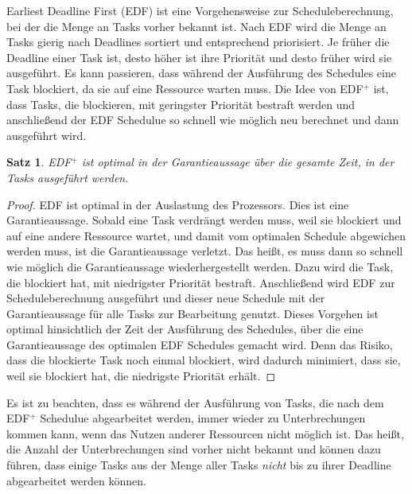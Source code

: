 \documentclass{scrarticle}
\newtheorem{satz}{Satz}[section]
\numberwithin{equation}{section}
\begin{document}
Earliest Deadline First (EDF) ist eine Vorgehensweise zur Scheduleberechnung, bei der die Menge an Tasks vorher bekannt ist. Nach EDF wird die Menge an Tasks gierig nach Deadlines sortiert und entsprechend priorisiert. Je früher die Deadline einer Task ist, desto höher ist ihre Priorität und desto früher wird sie ausgeführt. Es kann passieren, dass während der Ausführung des Schedules eine Task blockiert, da sie auf eine Ressource warten muss. Die Idee von EDF$^+$ ist, dass Tasks, die blockieren, mit geringster Priorität bestraft werden und anschließend der EDF Schedulue so schnell wie möglich neu berechnet und dann ausgeführt wird.
\begin{satz}
	EDF$^+$ ist optimal in der Garantieaussage über die gesamte Zeit, in der Tasks ausgeführt werden.
\end{satz}
\begin{proof}
	EDF ist optimal in der Auslastung des Prozessors. Dies ist eine Garantieaussage. Sobald eine Task verdrängt werden muss, weil sie blockiert und auf eine andere Ressource wartet, und damit vom optimalen Schedule abgewichen werden muss, ist die Garantieaussage verletzt. Das heißt, es muss dann so schnell wie möglich die Garantieaussage wiederhergestellt werden. Dazu wird die Task, die blockiert hat, mit niedrigster Priorität bestraft. Anschließend wird EDF zur Scheduleberechnung ausgeführt und dieser neue Schedule mit der Garantieaussage für alle Tasks zur Bearbeitung genutzt. Dieses Vorgehen ist optimal hinsichtlich der Zeit der Ausführung des Schedules, über die eine Garantieaussage des optimalen EDF Schedules gemacht wird. Denn das Risiko, dass die blockierte Task noch einmal blockiert, wird dadurch minimiert, dass sie, weil sie blockiert hat, die niedrigste Priorität erhält.
\end{proof}
Es ist zu beachten, dass es während der Ausführung von Tasks, die nach dem EDF$^+$ Schedulue abgearbeitet werden, immer wieder zu Unterbrechungen kommen kann, wenn das Nutzen anderer Ressourcen nicht möglich ist. Das heißt, die Anzahl der Unterbrechungen sind vorher nicht bekannt und können dazu führen, dass einige Tasks aus der Menge aller Tasks \textit{nicht} bis zu ihrer Deadline abgearbeitet werden können.
\end{document}
